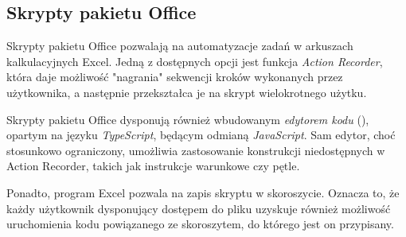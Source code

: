 \subsection{Skrypty pakietu Office}
Skrypty pakietu Office pozwalają na automatyzacje zadań w arkuszach kalkulacyjnych Excel. Jedną z dostępnych opcji jest  funkcja \emph{Action Recorder}, która daje możliwość "nagrania" sekwencji kroków wykonanych przez użytkownika, a następnie przekształca je na skrypt wielokrotnego użytku.\par
Skrypty pakietu Office dysponują również wbudowanym \emph{edytorem kodu} (), opartym na języku \emph{TypeScript}, będącym odmianą \emph{JavaScript}. Sam edytor, choć stosunkowo ograniczony, umożliwia zastosowanie konstrukcji niedostępnych w Action Recorder, takich jak instrukcje warunkowe czy pętle.\par
Ponadto, program Excel pozwala na zapis skryptu w skoroszycie. Oznacza to, że każdy użytkownik dysponujący dostępem do pliku uzyskuje również możliwość uruchomienia kodu powiązanego ze skoroszytem, do którego jest on przypisany.